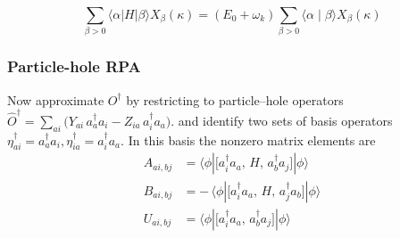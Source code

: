 \begin{equation}
\sum_{\beta>0}\langle\alpha| H|\beta\rangle X_\beta(\kappa)=\left(E_0+\omega_k\right) \sum_{\beta>0}\langle\alpha \mid \beta\rangle X_\beta(\kappa)
\end{equation}
\subsubsection{Particle-hole RPA}
\label{sec:ph_rpa}
\noindent Now approximate \(O^\dagger\) by restricting to particle–hole operators $
\hat O^\dagger
=\sum_{a i}\bigl(Y_{a i}\,a_a^\dagger a_i - Z_{i a}\,a_i^\dagger a_a\bigr).$ and identify two sets of basis operators $
\eta_{a i}^\dagger = a_a^\dagger a_i,
\eta_{i a}^\dagger = a_i^\dagger a_a.$
In this basis the nonzero matrix elements are
\begin{align}
A_{ai,bj}
&=\langle\phi|\bigl[a_i^\dagger a_a,\,H,\,a_b^\dagger a_j\bigr]|\phi\rangle\\
B_{ai,bj}
&=-\,\langle\phi|\bigl[a_i^\dagger a_a,\,H,\,a_j^\dagger a_b\bigr]|\phi\rangle \\
U_{ai,bj}
&=\langle\phi|\bigl[a_i^\dagger a_a,\,a_b^\dagger a_j\bigr]|\phi\rangle
\end{align}

\medskip

